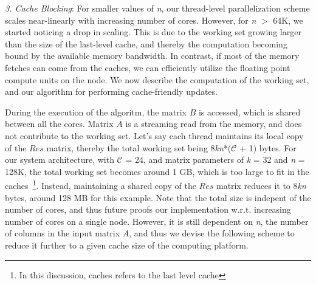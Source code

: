
     \vspace*{0.1in}
     {\it{3. Cache Blocking}}: For smaller values of {\it{n}}, our
     thread-level parallelization scheme scales near-linearly with
     increasing number of cores. However, for {\it{n}} $>$ 64K, we
     started noticing a drop in scaling. This is due to the working
     set growing larger than the size of the last-level cache, and
     thereby the computation becoming bound by the available memory
     bandwidth. In contrast, if most of the memory fetches can come
     from the caches, we can efficiently  utilize the floating
     point compute units on the node. We now
     describe the computation of the working set, and our algorithm
     for performing cache-friendly updates.

     During the execution of the algoritm, the matrix $B$ is
     accessed, which is shared between all the cores. Matrix $A$ is a
     streaming read from the memory, and does not contribute to
     the working set. Let's say each thread maintains  its local copy
     of the $Res$ matrix, thereby the total working set being
     8{\it{kn}}*($\mathcal{C}$ + 1) bytes. For our system
     architecture, with $\mathcal{C}$ = 24, and matrix parameters of
     {\it{k}} = 32 and {\it{n}} = 128K, the total working set becomes
     around 1 GB, which is too large to fit in the
     caches~\footnote{In this discussion, caches refers to the last
     level cache}. Instead,
     maintaining a shared copy of the $Res$ matrix reduces it to
     8{\it{kn}} bytes, around 128 MB for this example. Note that the
     total size is indepent of the number of cores, and thus future
     proofs our implementation w.r.t. increasing number of cores on a
     single node. However, it is still dependent on {\it{n}}, the
     number of columns in the input matrix $A$, and thus we devise the
     following scheme to reduce it further to a given cache size of
     the computing platform.

